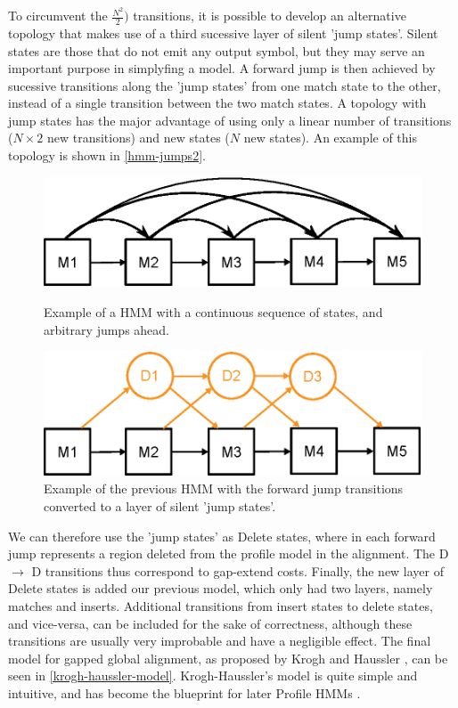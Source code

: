 To circumvent the $\frac{N^2}{2})$ transitions, it is possible to develop an alternative topology that makes use of a third sucessive layer of silent 'jump states'. Silent states are those that do not emit any output symbol, but they may serve an important purpose in simplyfing a model. A forward jump is then achieved by sucessive transitions along the 'jump states' from one match state to the other, instead of a single transition between the two match states. A topology with jump states has the major advantage of using only a linear number of transitions ($N\times2$ new transitions) and new states ($N$ new states). An example of this topology is shown in \autoref{hmm-jumps2}.

\begin{figure}[htb!]
	\begin{minipage}{0.48\linewidth}
		\centering
		\includegraphics[scale=0.6]{img-hmm/hmm-jumps1.eps}
		\caption[HMM with Delete gaps] {Example of a HMM with a continuous sequence of states, and arbitrary jumps ahead.}
		\label{hmm-jumps1}
	\end{minipage}
	\hspace{0.04\linewidth}
	\begin{minipage}{0.48\linewidth}
		\centering
		\includegraphics[scale=0.6]{img-hmm/hmm-jumps2.eps}
		\caption[HMM with Jump states] {Example of the previous HMM with the forward jump transitions converted to a layer of silent 'jump states'.}
		\label{hmm-jumps2}
	\end{minipage}
\end{figure} 

We can therefore use the 'jump states' as Delete states, where in each forward jump represents a region deleted from the profile model in the alignment. The D $\rightarrow$ D transitions thus correspond to gap-extend costs. Finally, the new layer of Delete states is added our previous model, which only had two layers, namely matches and inserts. Additional transitions from insert states to delete states, and vice-versa, can be included for the sake of correctness, although these transitions are usually very improbable and have a negligible effect. The final model for gapped global alignment, as proposed by Krogh and Haussler \cite{krogh1994}, can be seen in \autoref{krogh-haussler-model}. Krogh-Haussler's model is quite simple and intuitive, and has become the blueprint for later Profile HMMs \cite{sam}.


